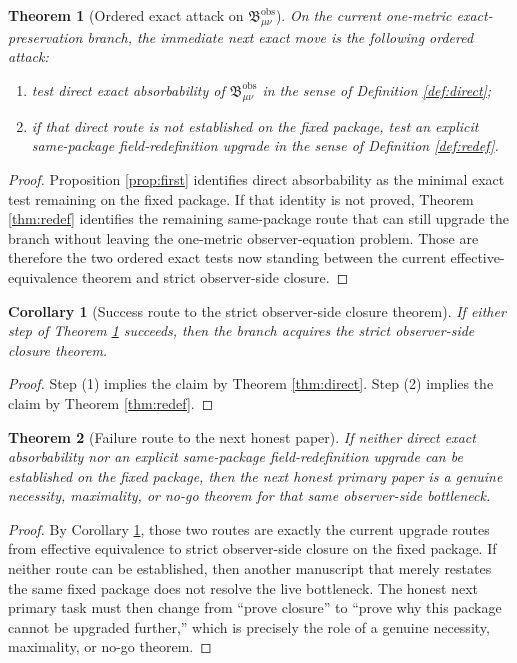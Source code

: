 \documentclass[11pt]{article}
\newcommand{\ObsBurden}{\mathfrak B_{\mu\nu}^{\mathrm{obs}}}
\newtheorem{corollary}{Corollary}
\newtheorem{theorem}{Theorem}
\begin{document}
\begin{theorem}[Ordered exact attack on \texorpdfstring{\(\ObsBurden\)}{ObsBurden}]
\label{thm:attack}
On the current one-metric exact-preservation branch, the immediate next exact move is the following ordered attack:
\begin{enumerate}
    \item test direct exact absorbability of \(\ObsBurden\) in the sense of Definition \ref{def:direct};
    \item if that direct route is not established on the fixed package, test an explicit same-package field-redefinition upgrade in the sense of Definition \ref{def:redef}.
\end{enumerate}
\end{theorem}

\begin{proof}
Proposition \ref{prop:first} identifies direct absorbability as the minimal exact test remaining on the fixed package. If that identity is not proved, Theorem \ref{thm:redef} identifies the remaining same-package route that can still upgrade the branch without leaving the one-metric observer-equation problem. Those are therefore the two ordered exact tests now standing between the current effective-equivalence theorem and strict observer-side closure.
\end{proof}

\begin{corollary}[Success route to the strict observer-side closure theorem]
\label{cor:success}
If either step of Theorem \ref{thm:attack} succeeds, then the branch acquires the strict observer-side closure theorem.
\end{corollary}

\begin{proof}
Step (1) implies the claim by Theorem \ref{thm:direct}. Step (2) implies the claim by Theorem \ref{thm:redef}.
\end{proof}

\begin{theorem}[Failure route to the next honest paper]
\label{thm:failure}
If neither direct exact absorbability nor an explicit same-package field-redefinition upgrade can be established on the fixed package, then the next honest primary paper is a genuine necessity, maximality, or no-go theorem for that same observer-side bottleneck.
\end{theorem}

\begin{proof}
By Corollary \ref{cor:success}, those two routes are exactly the current upgrade routes from effective equivalence to strict observer-side closure on the fixed package. If neither route can be established, then another manuscript that merely restates the same fixed package does not resolve the live bottleneck. The honest next primary task must then change from ``prove closure'' to ``prove why this package cannot be upgraded further,'' which is precisely the role of a genuine necessity, maximality, or no-go theorem.
\end{proof}
\end{document}
